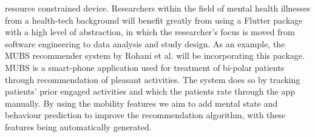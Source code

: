 resource constrained device. Researchers within the field of mental health illnesses from a health-tech background will benefit greatly from using a Flutter package with a high level of abstraction, in which the researcher's focus is moved from software engineering to data analysis and study design. As an example, the MUBS recommender system by Rohani et al. \cite{mubs-rohani} will be incorporating this package. MUBS is a smart-phone application used for treatment of bi-polar patients through recommendation of pleasant activities. The system does so by tracking patients' prior engaged activities and which the patients rate through the app manually. By using the mobility features we aim to add mental state and behaviour prediction to improve the recommendation algorithm, with these features being automatically generated.